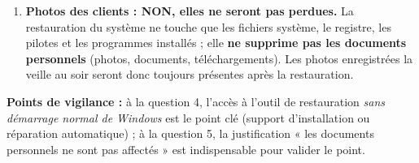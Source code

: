 \documentclass[11pt]{article}
\begin{document}
\begin{corrige}
\begin{enumerate}
\begin{enumerate}
\item Sélectionner le compte administrateur et saisir son mot de passe si demandé ;
\item Dans l'assistant, choisir le \textbf{point de restauration de la veille} (vérifier la date) ;
\item Confirmer et laisser la restauration s'exécuter ; le poste redémarre automatiquement avec l'ancien pilote et l'affichage redevient normal.
\end{enumerate}
\item \textbf{Photos des clients : NON, elles ne seront pas perdues.} La restauration du système ne touche que les fichiers système, le registre, les pilotes et les programmes installés ; elle \textbf{ne supprime pas les documents personnels} (photos, documents, téléchargements). Les photos enregistrées la veille au soir seront donc toujours présentes après la restauration.
\end{enumerate}
\textbf{Points de vigilance :} à la question 4, l'accès à l'outil de restauration \emph{sans démarrage normal de Windows} est le point clé (support d'installation ou réparation automatique) ; à la question 5, la justification « les documents personnels ne sont pas affectés » est indispensable pour valider le point.
\end{corrige}
\end{document}
